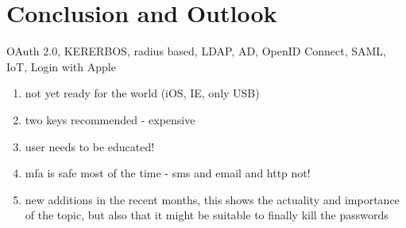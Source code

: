 \chapter{Conclusion and Outlook}

OAuth 2.0, KERERBOS, radius based, LDAP, AD, OpenID Connect, SAML, IoT, Login with Apple

\begin{enumerate}
	\item not yet ready for the world (iOS, IE, only USB)
	\item two keys recommended - expensive
	\item user needs to be educated!
	\item mfa is safe most of the time - sms and email and http not!
	\item new additions in the recent months, this shows the actuality and importance of the topic, but also that it might be suitable to finally kill the passwords
\end{enumerate}
